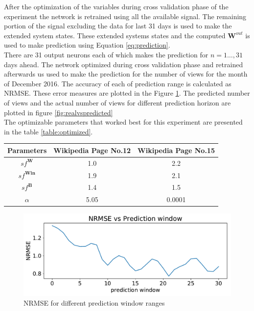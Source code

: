 
\indent \indent
After the optimization of the variables during cross validation phase of the experiment the network is retrained using all the available signal.  The remaining portion of the signal excluding the data for last 31 days is used to make the extended system states. These extended systems states and the computed $\textbf{W}^{out}$ is used to make prediction using Equation \ref{eq:prediction}. \\
There are 31 output neurons each of which makes the prediction for $n=1\hdots,31$ days ahead. The network optimized during cross validation phase and retrained afterwards us used to make the prediction for the number of views for the month of December 2016. The accuracy of each of prediction range is calculated as NRMSE. These error measures are plotted in the Figure \ref{fig:nrmsevspw}. The predicted number of views and the actual number of views for different prediction horizon are plotted in figure \ref{fig:realvspredicted}
\\
The optimizable parameters that worked best for this experiment are presented in the table \ref{table:optimized}.

	\begin{center}
	 \label{table:optimized} 
	\begin{tabular}{|c|c|c|} \hline
		Parameters & Wikipedia Page No.12 & Wikipedia Page No.15\\ \hline
		$sf^{\mathbf{W}}$& 1.0& 2.2\\ \hline
		$sf^{\mathbf{Win}}$& 1.9 &2.1\\ \hline
		$sf^{\mathbf{B}}$& 1.4&1.5\\ \hline
		$\alpha$& 5.05 &0.0001\\ \hline
	\end{tabular}
	\end{center}
	

  \begin{figure}[h]
     \centering
     \includegraphics[width=\textwidth]{./results/images/nrmsevspwrec}

      \caption{NRMSE for different prediction window ranges}\label{fig:nrmsevspw}
  \end{figure}
 
